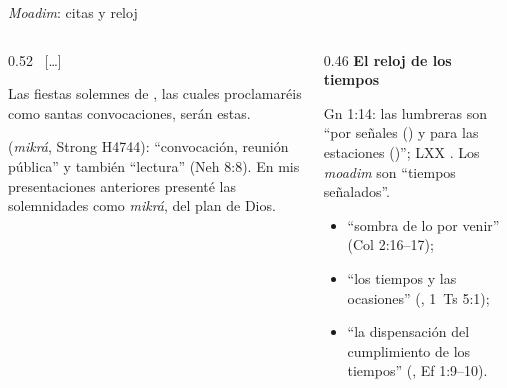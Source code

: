 \begin{frame}{\emph{Moadim}: citas y reloj}
\begin{columns}[t,onlytextwidth]
\begin{column}{0.52\textwidth}
\centering\small{}\ \foreignlanguage{spanish}{[\ldots]}\ 
\begin{cita}Las fiestas solemnes de \SENOR, las cuales proclamaréis como santas convocaciones, serán estas.\end{cita}
\scriptsize\RaggedRight {} (\emph{mikrá}, Strong H4744): ``convocación, reunión pública'' y también ``lectura'' (Neh 8:8). En mis presentaciones anteriores presenté las solemnidades como \emph{mikrá},  del plan de Dios.\par\smallskip
{}
\end{column}
\begin{column}{0.46\textwidth}\scriptsize\RaggedRight
\textbf{\small\textcolor{tierraroja}{El reloj de los tiempos}}\par\smallskip
Gn 1:14: las lumbreras son ``por señales () y para las estaciones ()''; LXX . Los \emph{moadim} son ``tiempos señalados''.
\begin{itemize}\scriptsize
\item ``sombra de lo por venir'' (Col 2:16--17);
\item ``los tiempos y las ocasiones'' (, 1~Ts 5:1);
\item ``la dispensación del cumplimiento de los tiempos'' (, Ef 1:9--10).
\end{itemize}
\end{column}
\end{columns}
\end{frame}

